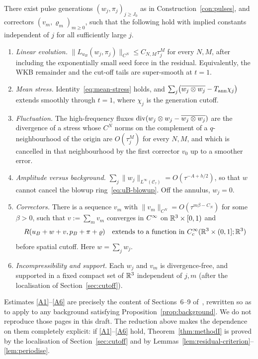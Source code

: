 \begin{assumption}
\label{ass:pulses}
There exist pulse generations $(w_j,\pi_j)_{j\ge J_0}$ as in Construction~\ref{con:pulses}, and correctors $(v_m,\varrho_m)_{m\ge 0}$, such that the following hold with implied constants independent of $j$ for all sufficiently large $j$.
\begin{enumerate}[label=\textup{(A\arabic*)}]
\item \label{A1} \emph{Linear evolution.} $\|L_{u_B}(w_j,\pi_j)\|_{C^N}\le C_{N,M}\tau_j^{M}$ for every $N,M$, after including the exponentially small seed force in the residual. Equivalently, the WKB remainder and the cut-off tails are super-smooth at $t=1$.
\item \label{A2} \emph{Mean stress.} Identity~\eqref{eq:mean-stress} holds, and $\sum_j\bigl(\overline{w_j\otimes w_j}-T_{\mathrm{ann}}\chi_j\bigr)$ extends smoothly through $t=1$, where $\chi_j$ is the generation cutoff.
\item \label{A3} \emph{Fluctuation.} The high-frequency fluxes $\operatorname{div}(w_j\otimes w_j-\overline{w_j\otimes w_j})$ are the divergence of a stress whose $C^N$ norms on the complement of a $q$-neighbourhood of the origin are $O(\tau_j^{M})$ for every $N,M$, and which is cancelled in that neighbourhood by the first corrector $v_0$ up to a smoother error.
\item \label{A4} \emph{Amplitude versus background.} $\sum_j\|w_j\|_{L^\infty(\mathcal C_\tau)}=O(\tau^{-A+h/2})$, so that $w$ cannot cancel the blowup ring~\eqref{eq:uB-blowup}. Off the annulus, $w_j=0$.
\item \label{A5} \emph{Correctors.} There is a sequence $v_m$ with $\|v_m\|_{C^N}=O(\tau^{m\beta-C_N})$ for some $\beta>0$, such that $v:=\sum_m v_m$ converges in $C^\infty$ on $\mathbb{R}^3\times[0,1)$ and
    \[
    R(u_B+w+v,p_B+\pi+\varrho)
    \quad\text{extends to a function in }C_c^\infty(\mathbb{R}^3\times(0,1];\mathbb{R}^3)
    \]
    before spatial cutoff. Here $w=\sum_j w_j$.
\item \label{A6} \emph{Incompressibility and support.} Each $w_j$ and $v_m$ is divergence-free, and supported in a fixed compact set of $\mathbb{R}^3$ independent of $j,m$ (after the localisation of Section~\ref{sec:cutoff}).
\end{enumerate}
\end{assumption}

\begin{remark}
\label{rem:assI-status}
Estimates \ref{A1}--\ref{A6} are precisely the content of Sections~6--9 of~\cite{openai2026ns}, rewritten so as to apply to any background satisfying Proposition~\ref{prop:background}. We do not reproduce those pages in this draft. The reduction above makes the dependence on them completely explicit: if \ref{A1}--\ref{A6} hold, Theorem~\ref{thm:methodI} is proved by the localisation of Section~\ref{sec:cutoff} and by Lemmas~\ref{lem:residual-criterion}--\ref{lem:periodise}.
\end{remark}

